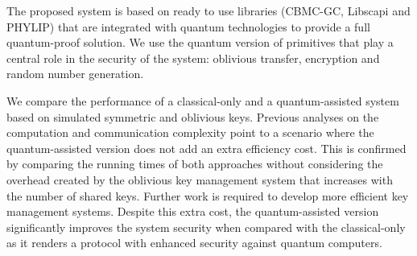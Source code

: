 The proposed system is based on ready to use libraries (CBMC-GC, Libscapi and PHYLIP) that are integrated with quantum technologies to provide a full quantum-proof solution. We use the quantum version of primitives that play a central role in the security of the system: oblivious transfer, encryption and random number generation.

We compare the performance of a classical-only and a quantum-assisted system based on simulated symmetric and oblivious keys. Previous analyses on the computation and communication complexity point to a scenario where the quantum-assisted version does not add an extra efficiency cost. This is confirmed by comparing the running times of both approaches without considering the overhead created by the oblivious key management system that increases with the number of shared keys. Further work is required to develop more efficient key management systems. Despite this extra cost, the quantum-assisted version significantly improves the system security when compared with the classical-only as it renders a protocol with enhanced security against quantum computers.








%
%
%
